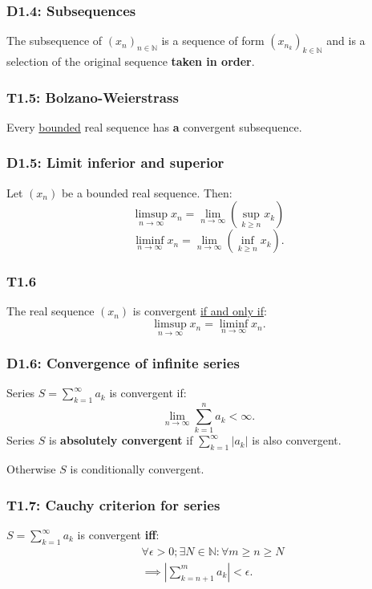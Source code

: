 \documentclass{article}
\begin{document}
\begin{multicols*}{3}
\subsubsection*{D1.4: Subsequences}
The subsequence of $(x_n)_{n\in\mathbb{N}}$ is
a sequence of form $(x_{n_k})_{k\in\mathbb{N}}$
and is a selection of the original sequence 
\textbf{taken in order}.

\subsubsection*{T1.5: Bolzano-Weierstrass}
Every \underline{bounded} real sequence has \textbf{a}
convergent subsequence.

\subsubsection*{D1.5: Limit inferior and superior}
Let $(x_n)$ be a bounded real sequence. Then:
$$\limsup_{n\rightarrow\infty}x_n
=\lim_{n\rightarrow\infty}\left(\sup_{k\geq n}x_k\right)$$
$$\liminf_{n\rightarrow\infty}x_n
=\lim_{n\rightarrow\infty}\left(\inf_{k\geq n}x_k\right).$$

\subsubsection*{T1.6}
The real sequence $(x_n)$ is convergent
\underline{if and only if}:
$$\limsup_{n\rightarrow\infty}x_n
=\liminf_{n\rightarrow\infty}x_n.$$

\subsubsection*{D1.6: Convergence of infinite series}
Series $\displaystyle S=\sum_{k=1}^{\infty}a_k$ is
convergent if:
$$\lim_{n\rightarrow\infty}\sum_{k=1}^{n}a_k<\infty.$$
Series $S$ is \textbf{absolutely convergent} if
$\displaystyle\sum_{k=1}^{\infty}|a_k|$ is also convergent.

Otherwise $S$ is conditionally convergent.

\subsubsection*{T1.7: Cauchy criterion for series}
$\displaystyle S=\sum_{k=1}^{\infty}a_k$ is convergent \textbf{if{}f}:
\begin{align*}
    &\forall\epsilon>0; \exists N\in\mathbb{N}:
    \forall m\geq n\geq N \\
    &\implies \left|\sum_{k=n+1}^{m}a_k\right|<\epsilon.
\end{align*}


\end{multicols*}
\end{document}
